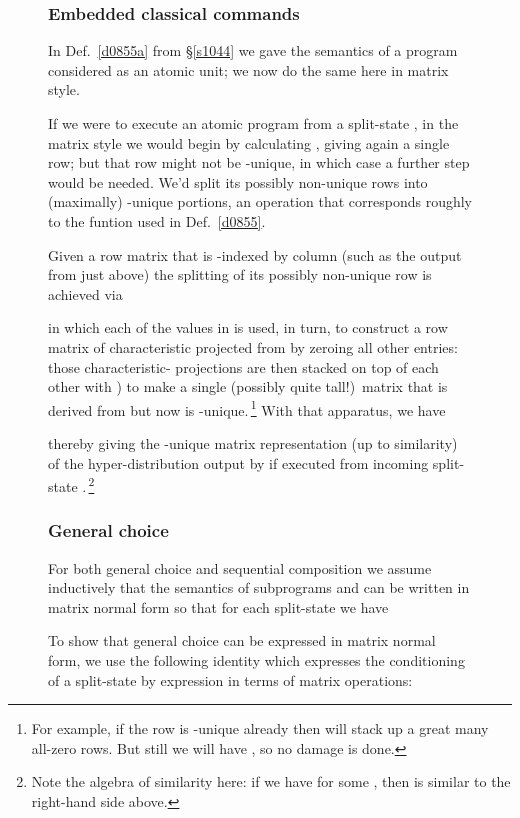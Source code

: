 \documentclass[runningheads]{llncs}
\newcommand\Sec[1] {Sec.~\ref{#1}}
\renewcommand\Sec[1] {\S\ref{#1}}
\newenvironment{Figure}[2][t]{\begin{figure}[#1]\def\Label{#2}\small}{\label{\Label}\end{figure}}
\newcommand\Def[1] {Def.~\ref{#1}}
\begin{document}
\begin{Figure}[ht!]{f1228}
\subsubsection{Embedded classical commands}

In \Def{d0855a} from \Sec{s1044} we gave the semantics  of a program  considered as an atomic unit; we now do the same here in matrix style.

If we were to execute an atomic program  from a split-state , in the matrix style we would begin by calculating , giving again a single row; but that row might not be -unique, in which case a further step would be needed. We'd split its possibly non-unique rows into (maximally) -unique portions, an operation that corresponds roughly to the  funtion used in \Def{d0855}.

Given a row matrix  that is -indexed by column (such as the output  from just above) the splitting of its possibly non-unique row is achieved via

in which each of the values  in  is used, in turn, to construct a row matrix of characteristic  projected from  by zeroing all other entries: those characteristic- projections are then stacked on top of each other with ) to make a single (possibly quite tall!)\ matrix that is derived from  but now is -unique.\,\footnote{For example, if the row  is -unique already then  will stack up a great many all-zero rows. But still we will have , so no damage is done.}
With that apparatus, we have

thereby giving the -unique matrix representation (up to similarity) of the hyper-distribution output by  if executed from incoming split-state .\,\footnote{Note the algebra of similarity here: if we have  for some , then  is similar to the right-hand side above.}

\subsubsection{General choice}

For both general choice and sequential composition we assume inductively that the semantics of subprograms  and  can be written in matrix normal form so that for each split-state  we have


To show that general choice can be expressed in matrix normal form, we use the following identity which expresses the conditioning of a split-state  by expression  in terms of matrix operations:




\end{Figure}
\end{document}

